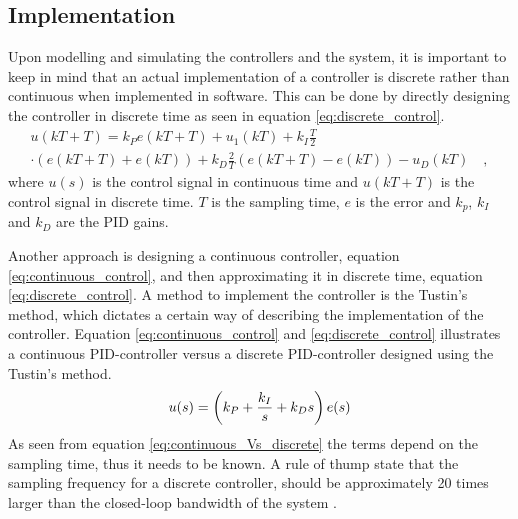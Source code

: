 \documentclass[../../main.tex]{subfiles}
\begin{document}
\subsection*{Implementation}
Upon modelling and simulating the controllers and the system, it is important to keep in mind that an actual implementation of a controller is discrete rather than continuous when implemented in software. This can be done by directly designing the controller in discrete time as seen in equation \ref{eq:discrete_control}.
\begin{multline}\label{eq:discrete_control}
        u(kT+T)=k_Pe(kT+T)+u_1(kT) + k_I\frac{T}{2} \\ \cdot (e(kT+T)+e(kT))+k_D \frac{2}{T}(e(kT+T)-e(kT))-u_D(kT) \quad ,
\end{multline}
where $u(s)$ is the control signal in continuous time and $u(kT+T)$ is the control signal in discrete time. $T$ is the sampling time, $e$ is the error and $k_p$, $k_I$ and $k_D$ are the PID gains.

Another approach is designing a continuous controller, equation \ref{eq:continuous_control}, and then approximating it in discrete time, equation \ref{eq:discrete_control}. 
A method to implement the controller is the Tustin's method, which dictates a certain way of describing the implementation of the controller. Equation \ref{eq:continuous_control} and \ref{eq:discrete_control} illustrates a continuous PID-controller versus a discrete PID-controller designed using the Tustin's method.
\begin{equation}\label{eq:continuous_control}
        u(s) =\left(k_P+\frac{k_I}{s}+k_Ds\right)e(s)\\
\end{equation}
As seen from equation \ref{eq:continuous_Vs_discrete} the terms depend on the sampling time, thus it needs to be known. A rule of thump state that the sampling frequency for a discrete controller, should be approximately 20 times larger than the closed-loop bandwidth of the system \cite{Design_Of_Digital_Control_Systems_NOTE}. 
\end{document}

